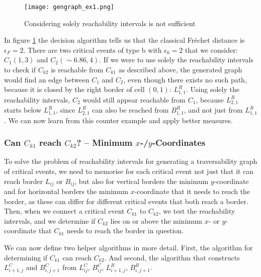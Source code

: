 \begin{figure}[H]
    \centering
    
    \texttt{[image: gengraph\_ex1.png]}
		
	\caption{Considering solely reachability intervals is not sufficient\protect\footnotemark}
    \label{fig:gengraph_ex1}
\end{figure}

In figure \ref{fig:gengraph_ex1} the decision algorithm tells us that the classical Fréchet distance is $\epsilon_F = 2$. There are two critical events of type b with $\epsilon_0 = 2$ that we consider: $C_1(1, 3)$ and $C_2(\sim6.86, 4)$. If we were to use solely the reachability intervals to check if $C_{k2}$ is reachable from $C_{k1}$ as described above, the generated graph would find an edge between $C_1$ and $C_2$, even though there exists no such path, because it is closed by the right border of cell $(0, 1)$: $L_{1, 1}^R$. Using solely the reachability intervals, $C_2$ would still appear reachable from $C_1$, because $L_{2, 1}^R$ starts below $L_{1, 1}^R$, since $L_{2, 1}^R$ can also be reached from $B_{1,1}^R$, and not just from $L_{1, 1}^R$. We can now learn from this counter example and apply better measures.

\subsubsection{Can $C_{k1}$ reach $C_{k2}$? – Minimum $x$-/$y$-Coordinates}

To solve the problem of reachability intervals for generating a traversability graph of critical events, we need to memorise for each critical event not just that it can reach border $L_{ij}$ or $B_{ij}$, but also for vertical borders the minimum $y$-coordinate and for horizontal borders the minimum $x$-coordinate that it needs to reach the border, as these can differ for different critical events that both reach a border. Then, when we connect a critical event $C_{k1}$ to $C_{k2}$, we test the reachability intervals, and we determine if $C_{k2}$ lies on or above the minimum $x$- or $y$-coordinate that $C_{k1}$ needs to reach the border in question.

We can now define two helper algorithms in more detail. First, the algorithm for determining if $C_{k1}$ can reach $C_{k2}$. And second, the algorithm that constructs $L_{i+1, j}^C$ and $B_{i, j+1}^C$ from $L_{ij}^C$, $B_{ij}^C$, $L_{i+1, j}^R$, $B_{i, j+1}^R$.

